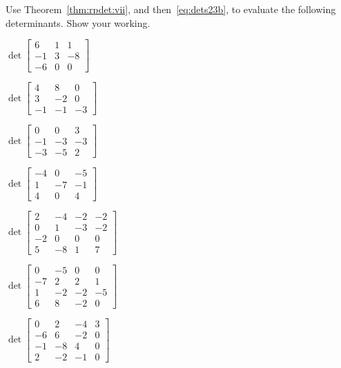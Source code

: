 \begin{exercise} \label{ex:} 
Use Theorem~\ref{thm:rpdet:vii}, and then~\eqref{eq:dets23b}, to evaluate the following determinants.
Show your working.
\begin{parts}
\item \(\det\begin{bmatrix} 6 & 1 & 1
\\-1 & 3 & -8
\\-6 & 0 & 0 \end{bmatrix}\)

\item \(\det\begin{bmatrix} 4 & 8 & 0
\\3 & -2 & 0
\\-1 & -1 & -3 \end{bmatrix}\)

\item \(\det\begin{bmatrix} 0 & 0 & 3
\\-1 & -3 & -3
\\-3 & -5 & 2 \end{bmatrix}\)

\item \(\det\begin{bmatrix} -4 & 0 & -5
\\1 & -7 & -1
\\4 & 0 & 4 \end{bmatrix}\)

\item \(\det\begin{bmatrix} 2 & -4 & -2 & -2
\\0 & 1 & -3 & -2
\\-2 & 0 & 0 & 0
\\5 & -8 & 1 & 7 \end{bmatrix}\)

\item \(\det\begin{bmatrix} 0 & -5 & 0 & 0
\\-7 & 2 & 2 & 1
\\1 & -2 & -2 & -5
\\6 & 8 & -2 & 0 \end{bmatrix}\)

\item \(\det\begin{bmatrix} 0 & 2 & -4 & 3
\\-6 & 6 & -2 & 0
\\-1 & -8 & 4 & 0
\\2 & -2 & -1 & 0 \end{bmatrix}\)


\end{parts}
\end{exercise}
